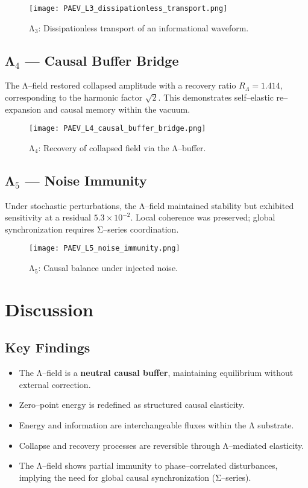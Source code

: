 \documentclass[12pt]{article}
\begin{document}
\begin{figure}[H]
\centering
\texttt{[image: PAEV\_L3\_dissipationless\_transport.png]}
\caption{Λ$_3$: Dissipationless transport of an informational waveform.}
\end{figure}

\subsection{Λ$_4$ --- Causal Buffer Bridge}
The Λ--field restored collapsed amplitude with a recovery ratio $R_\Lambda = 1.414$, corresponding to the harmonic factor $\sqrt{2}$.
This demonstrates self--elastic re--expansion and causal memory within the vacuum.

\begin{figure}[H]
\centering
\texttt{[image: PAEV\_L4\_causal\_buffer\_bridge.png]}
\caption{Λ$_4$: Recovery of collapsed field via the Λ--buffer.}
\end{figure}

\subsection{Λ$_5$ --- Noise Immunity}
Under stochastic perturbations, the Λ--field maintained stability but exhibited sensitivity at a residual $5.3\times10^{-2}$.
Local coherence was preserved; global synchronization requires Σ--series coordination.

\begin{figure}[H]
\centering
\texttt{[image: PAEV\_L5\_noise\_immunity.png]}
\caption{Λ$_5$: Causal balance under injected noise.}
\end{figure}

\section{Discussion}

\subsection{Key Findings}
\begin{itemize}
\item The Λ--field is a \textbf{neutral causal buffer}, maintaining equilibrium without external correction.
\item Zero--point energy is redefined as structured causal elasticity.
\item Energy and information are interchangeable fluxes within the Λ substrate.
\item Collapse and recovery processes are reversible through Λ--mediated elasticity.
\item The Λ--field shows partial immunity to phase--correlated disturbances, implying the need for global causal synchronization (Σ--series).
\end{itemize}
\end{document}
